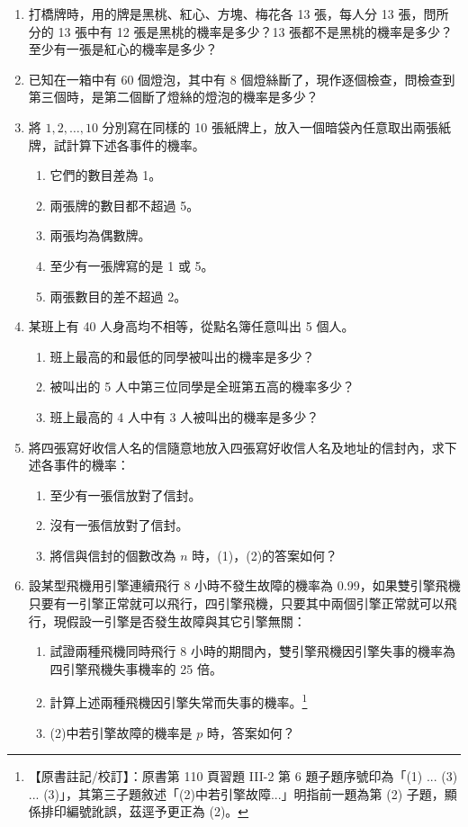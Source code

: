 \begin{enumerate}[label=\textbf{\arabic*.}]
  \item 打橋牌時，用的牌是黑桃、紅心、方塊、梅花各 13 張，每人分 13 張，問所分的 13 張中有 12 張是黑桃的機率是多少？13 張都不是黑桃的機率是多少？至少有一張是紅心的機率是多少？
  \item 已知在一箱中有 60 個燈泡，其中有 8 個燈絲斷了，現作逐個檢查，問檢查到第三個時，是第二個斷了燈絲的燈泡的機率是多少？
  \item 將 $1, 2, \dots, 10$ 分別寫在同樣的 10 張紙牌上，放入一個暗袋內任意取出兩張紙牌，試計算下述各事件的機率。
  \begin{enumerate}[label=(\arabic*)]
    \item 它們的數目差為 1。
    \item 兩張牌的數目都不超過 5。
    \item 兩張均為偶數牌。
    \item 至少有一張牌寫的是 1 或 5。
    \item 兩張數目的差不超過 2。
  \end{enumerate}
  \item 某班上有 40 人身高均不相等，從點名簿任意叫出 5 個人。
  \begin{enumerate}[label=(\arabic*)]
    \item 班上最高的和最低的同學被叫出的機率是多少？
    \item 被叫出的 5 人中第三位同學是全班第五高的機率多少？
    \item 班上最高的 4 人中有 3 人被叫出的機率是多少？
  \end{enumerate}
  \item 將四張寫好收信人名的信隨意地放入四張寫好收信人名及地址的信封內，求下述各事件的機率：
  \begin{enumerate}[label=(\arabic*)]
    \item 至少有一張信放對了信封。
    \item 沒有一張信放對了信封。
    \item 將信與信封的個數改為 $n$ 時，(1)，(2)的答案如何？
  \end{enumerate}
  \item 設某型飛機用引擎連續飛行 8 小時不發生故障的機率為 0.99，如果雙引擎飛機只要有一引擎正常就可以飛行，四引擎飛機，只要其中兩個引擎正常就可以飛行，現假設一引擎是否發生故障與其它引擎無關：
  \begin{enumerate}[label=(\arabic*)]
    \item 試證兩種飛機同時飛行 8 小時的期間內，雙引擎飛機因引擎失事的機率為四引擎飛機失事機率的 25 倍。
    \item 計算上述兩種飛機因引擎失常而失事的機率。\label{note:b5-ch3-p110-q6-subnum}\footnote{【原書註記/校訂】：原書第 110 頁習題 III-2 第 6 題子題序號印為「(1) ... (3) ... (3)」，其第三子題敘述「(2)中若引擎故障...」明指前一題為第 (2) 子題，顯係排印編號訛誤，茲逕予更正為 (2)。}
    \item (2)中若引擎故障的機率是 $p$ 時，答案如何？
  \end{enumerate}
\end{enumerate}

